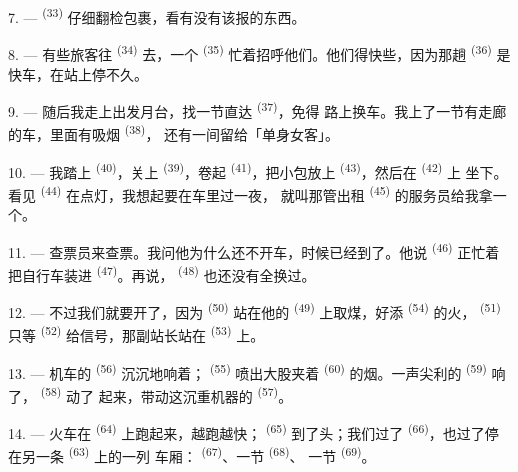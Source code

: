 7. ---  \textsuperscript{(33)} 仔细翻检包裹，看有没有该报的东西。

8. --- 有些旅客往 \textsuperscript{(34)} 去，一个
\textsuperscript{(35)} 忙着招呼他们。他们得快些，因为那趟
\textsuperscript{(36)} 是快车，在站上停不久。

9. --- 随后我走上出发月台，找一节直达 \textsuperscript{(37)}，免得
路上换车。我上了一节有走廊的车，里面有吸烟 \textsuperscript{(38)}，
还有一间留给「单身女客」。

\VUsaut{3.0mm}

10. --- 我踏上 \textsuperscript{(40)}，关上
\textsuperscript{(39)}，卷起 \textsuperscript{(41)}，把小包放上
 \textsuperscript{(43)}，然后在 \textsuperscript{(42)} 上
坐下。看见 \textsuperscript{(44)} 在点灯，我想起要在车里过一夜，
就叫那管出租 \textsuperscript{(45)} 的服务员给我拿一个。

11. --- 查票员来查票。我问他为什么还不开车，时候已经到了。他说
 \textsuperscript{(46)} 正忙着把自行车装进
\textsuperscript{(47)}。再说， \textsuperscript{(48)} 也还没有全换过。

12. --- 不过我们就要开了，因为 \textsuperscript{(50)} 站在他的
 \textsuperscript{(49)} 上取煤，好添 \textsuperscript{(54)}
的火， \textsuperscript{(51)} 只等 \textsuperscript{(52)}
给信号，那副站长站在 \textsuperscript{(53)} 上。

13. --- 机车的 \textsuperscript{(56)} 沉沉地响着；
\textsuperscript{(55)} 喷出大股夹着 \textsuperscript{(60)} 的烟。一声尖利的
 \textsuperscript{(59)} 响了， \textsuperscript{(58)} 动了
起来，带动这沉重机器的 \textsuperscript{(57)}。

\VUsaut{3.0mm}
\VUsaut{3.0mm}

14. --- 火车在 \textsuperscript{(64)} 上跑起来，越跑越快；
 \textsuperscript{(65)} 到了头；我们过了
\textsuperscript{(66)}，也过了停在另一条 \textsuperscript{(63)} 上的一列
车厢： \textsuperscript{(67)}、一节 \textsuperscript{(68)}、
一节 \textsuperscript{(69)}。

